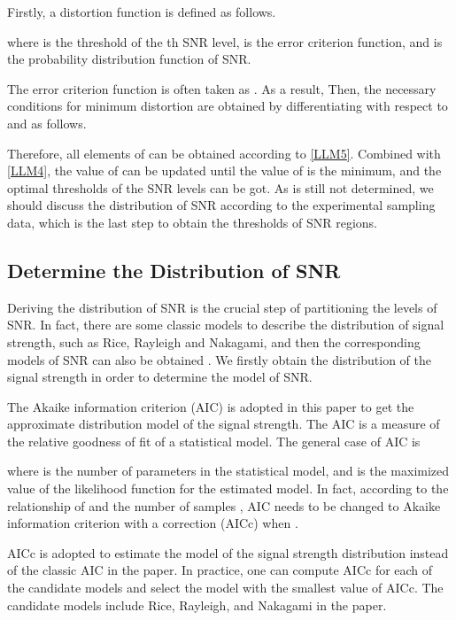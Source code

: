 \documentclass[conference]{IEEEtran}
\begin{document}
Firstly, a distortion function  is defined as follows.

where  is the threshold of the th SNR level,  is the error criterion function, and  is the probability distribution function of SNR.





 The error criterion function  is often taken as  \cite{Digital_communications}. As a result, Then, the necessary conditions for minimum distortion are obtained by differentiating  with respect to  and  as follows.


Therefore, all elements of  can be obtained according to \eqref{LLM5}. Combined with \eqref{LLM4}, the value of  can be updated until the value of  is the minimum, and the optimal thresholds of the SNR levels can be got.  As  is still not determined,  we should discuss the distribution of SNR according to the experimental sampling data, which is the last step to obtain the thresholds of SNR regions.




\subsection{Determine the Distribution of SNR}

Deriving the distribution of SNR is the crucial step of partitioning the levels of SNR. In fact, there are some classic models to describe the distribution of signal strength, such as Rice, Rayleigh and Nakagami, and then the corresponding models of SNR can also be obtained \cite{Digital_Communication_over_Fading_Channels}. We firstly obtain the distribution of the signal strength in order to determine the model of SNR.

The Akaike information criterion (AIC) is adopted in this paper to get the approximate distribution model of the signal strength. The AIC is a measure of the relative goodness of fit of a statistical model. The general case of AIC is \cite{Model_selection_and_multimodel_inference}

where  is the number of parameters in the statistical model, and  is the maximized value of the likelihood function for the estimated model.
In fact, according to the relationship of  and the number of samples , AIC needs to be changed to Akaike information criterion with a correction (AICc) when  \cite{Model_selection_and_multimodel_inference}.

AICc is adopted to estimate the model of the signal strength distribution instead of the classic AIC in the paper. In practice, one can compute AICc for each of the candidate models and select the model with the smallest value of AICc. The candidate models include Rice, Rayleigh, and Nakagami in the paper.
\end{document}
